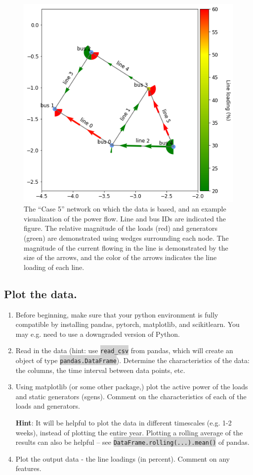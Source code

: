 \documentclass[11pt]{article}
\newcommand{\code}[1]{\colorbox{lightgray}{\texttt{#1}}}
\begin{document}
\begin{figure}[h]
\centering
\includegraphics[width=0.5\columnwidth]{case_5.png}
\caption{The ``Case 5'' network on which the data is based, and an example visualization of the power flow.
  Line and bus IDs are indicated  the figure. The relative magnitude of the loads (red) and generators (green)
  are demonstrated using wedges surrounding each node. The magnitude of the current flowing in the line is
  demonstrated by the size of the arrows, and the color of the arrows indicates the line loading of each line.
}

\end{figure}

\subsection{Plot the data.}

\begin{enumerate}
\item Before beginning, make sure that your python environment is fully compatible by
  installing pandas, pytorch, matplotlib, and scikitlearn. You may e.g. need to use a downgraded
  version of Python.
\item Read in the data (hint: use \code{read\_csv} from pandas, which will create an object of
  type \code{pandas.DataFrame}). Determine the characteristics
  of the data: the columns, the time interval between data points, etc.
\item Using matplotlib (or some other package,) plot the active power of the loads and static
  generators (sgens). Comment on the characteristics of each of the loads and generators.

  \textbf{Hint}: It will be helpful to plot the data in different timescales (e.g. 1-2 weeks), instead of
  plotting the entire year. Plotting a rolling average of the results can also be helpful -- see
  \code{DataFrame.rolling(...).mean()} of pandas.
\item Plot the output data - the line loadings (in percent). Comment on any features.
\end{enumerate}
\end{document}
